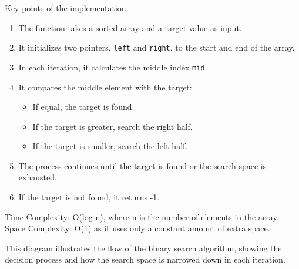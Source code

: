 Key points of the implementation:

\begin{enumerate}
\def\labelenumi{\arabic{enumi}.}
\tightlist
\item
  The function takes a sorted array and a target value as input.
\item
  It initializes two pointers, \texttt{left} and \texttt{right}, to the
  start and end of the array.
\item
  In each iteration, it calculates the middle index \texttt{mid}.
\item
  It compares the middle element with the target:

  \begin{itemize}
  \tightlist
  \item
    If equal, the target is found.
  \item
    If the target is greater, search the right half.
  \item
    If the target is smaller, search the left half.
  \end{itemize}
\item
  The process continues until the target is found or the search space is
  exhausted.
\item
  If the target is not found, it returns -1.
\end{enumerate}

Time Complexity: O(log n), where n is the number of elements in the
array. Space Complexity: O(1) as it uses only a constant amount of extra
space.

\begin{Shaded}
\begin{Highlighting}[]
\end{Highlighting}
\end{Shaded}

This diagram illustrates the flow of the binary search algorithm,
showing the decision process and how the search space is narrowed down
in each iteration.

